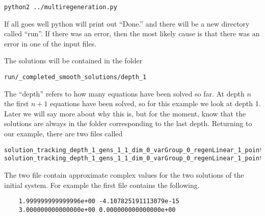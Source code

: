 \documentclass[12pt]{article}
\theoremstyle{definition}
\begin{document}
\begin{leftbar}
\vspace{-10pt} 
\begin{verbatim}
python2 ../multiregeneration.py
\end{verbatim}\vspace{-10pt} 
\end{leftbar}

If all goes well python will print out ``Done.'' and there will be 
a new directory called ``run''. If there was an error, then the most 
likely cause is that there was an error in one of the input files.

The solutions will be contained in the folder 

\begin{leftbar}
\vspace{-10pt} 
\begin{verbatim}
run/_completed_smooth_solutions/depth_1
\end{verbatim}\vspace{-10pt} 
\end{leftbar}

The ``depth'' refers to how many equations have been solved so far. At 
depth $n$ the first $n+1$ equations have been solved, so for this 
example we look at depth 1. Later we will say more about why this is, 
but for the moment, know that the solutions are always in the folder 
corresponding to the last depth. Returning to our example, there are two 
files called  

\begin{leftbar}
\vspace{-10pt} 
\begin{verbatim}
solution_tracking_depth_1_gens_1_1_dim_0_varGroup_0_regenLinear_1_pointId_326664877375_788310760051
solution_tracking_depth_1_gens_1_1_dim_0_varGroup_0_regenLinear_1_pointId_918720474422_183602510053 
\end{verbatim}\vspace{-10pt} 
\end{leftbar}
The two file contain approximate complex values for the two solutions of 
the initial system. For example the first file contains the following.


\begin{leftbar}
\vspace{-10pt} 
\begin{verbatim}
    1.999999999999996e+00 -4.107825191113079e-15
    3.000000000000000e+00 0.000000000000000e+00
\end{verbatim}\vspace{-10pt} 
\end{leftbar}
\end{document}
